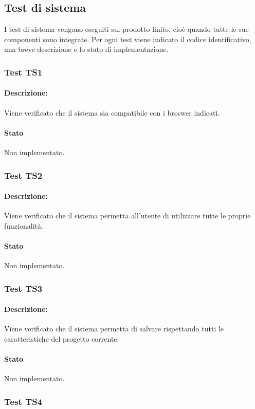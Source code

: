 \documentclass[../PianoDiQualifica.tex]{subfiles}
\begin{document}
	\subsection{Test di sistema} 
	I test di sistema vengono eseguiti sul prodotto finito, cioè quando tutte le sue componenti 
	sono integrate.  
	Per ogni test viene indicato il codice identificativo, una breve descrizione e lo stato di implementazione. 
	
	\subsubsection{Test TS1} 
	\paragraph{Descrizione:} Viene verificato che il sistema sia compatibile con i broswer indicati.
	\paragraph{Stato} Non implementato.
	
	\subsubsection{Test TS2} 
	\paragraph{Descrizione:} Viene verificato che il sistema permetta
	all’utente di utilizzare tutte le proprie funzionalità.
	\paragraph{Stato} Non implementato.
	
	\subsubsection{Test TS3} 
	\paragraph{Descrizione:} Viene verificato che il sistema permetta di salvare rispettando tutti le caratteristiche del progetto corrente.
	\paragraph{Stato} Non implementato.
	
	\subsubsection{Test TS4} 
\end{document}
